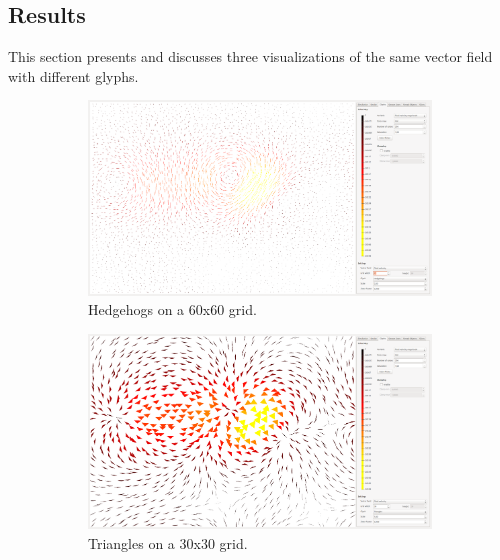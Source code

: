 \subsection{Results} %
\label{ssec:glyphs:results}
This section presents and discusses three visualizations of the same vector field with different glyphs.

\begin{figure}[tb]
	\centering
	\begin{subfigure}{0.6\textwidth}
	\centering
	\includegraphics[width=\textwidth, trim={35px 30px 430px 30px},clip]{img/glyphs/hedgehogs.png}
	\caption{Hedgehogs on a 60x60 grid.}
	\label{fig:glyphs:hedgehogs}
	\end{subfigure}
	\begin{subfigure}{0.6\textwidth}
		\centering
		\includegraphics[width=\textwidth, trim={35px 30px 430px 30px},clip]{img/glyphs/triangles.png}
		\caption{Triangles on a 30x30 grid.}
		\label{fig:glyphs:triangles}
	\end{subfigure}
	\begin{subfigure}{0.6\textwidth}
		\centering

\end{subfigure}
\end{figure}
